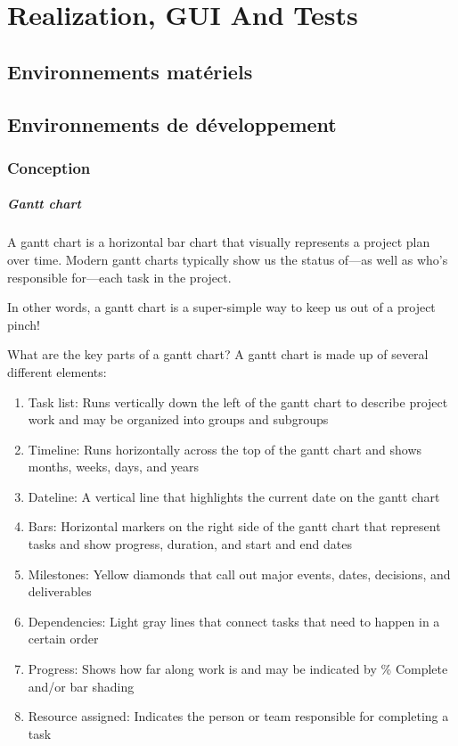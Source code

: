 

\chapter{Realization, GUI And Tests}%
\label{chap:chapter_four}

\section{Environnements matériels}
\section{Environnements de développement}
\subsection{Conception}


\paragraph{Gantt chart}
A gantt chart is a horizontal bar chart that visually represents a project plan over time. Modern gantt charts typically show us the status of—as well as who’s responsible for—each task in the project.

In other words, a gantt chart is a super-simple way to keep us out of a project pinch!

What are the key parts of a gantt chart?
A gantt chart is made up of several different elements:
\begin{enumerate}
      \item
            Task list: Runs vertically down the left of the gantt chart to describe project work and may be organized into groups and subgroups
      \item
            Timeline: Runs horizontally across the top of the gantt chart and shows months, weeks, days, and years
      \item
            Dateline: A vertical line that highlights the current date on the gantt chart
      \item
            Bars: Horizontal markers on the right side of the gantt chart that represent tasks and show progress, duration, and start and end dates
      \item
            Milestones: Yellow diamonds that call out major events, dates, decisions, and deliverables
      \item
            Dependencies: Light gray lines that connect tasks that need to happen in a certain order
      \item
            Progress: Shows how far along work is and may be indicated by \% Complete and/or bar shading
      \item
            Resource assigned: Indicates the person or team responsible for completing a task
\end{enumerate}


